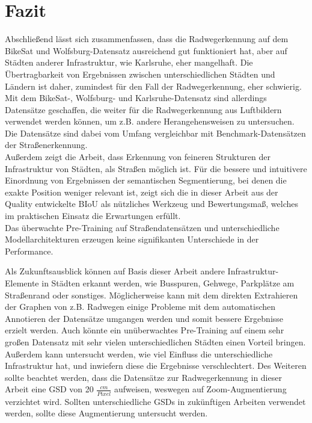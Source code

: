 \chapter{Fazit}

Abschließend lässt sich zusammenfassen, dass die Radwegerkennung auf dem BikeSat und Wolfsburg-Datensatz 
ausreichend gut funktioniert hat, aber auf Städten anderer Infrastruktur, wie Karlsruhe, eher mangelhaft.
Die Übertragbarkeit von Ergebnissen zwischen unterschiedlichen Städten und Ländern ist daher, zumindest 
für den Fall der Radwegerkennung, eher schwierig. Mit dem BikeSat-, Wolfsburg- und Karlsruhe-Datensatz 
sind allerdings Datensätze geschaffen, die weiter für die Radwegerkennung aus Luftbildern verwendet 
werden können, um z.B. andere Herangehensweisen zu untersuchen. Die Datensätze sind dabei vom Umfang 
vergleichbar mit Benchmark-Datensätzen der Straßenerkennung. \\
Außerdem zeigt die Arbeit, dass Erkennung von feineren Strukturen der Infrastruktur von Städten, als Straßen 
möglich ist. Für die bessere und intuitivere Einordnung von Ergebnissen der semantischen Segmentierung, 
bei denen die exakte Position weniger relevant ist, zeigt sich die in dieser Arbeit aus der Quality entwickelte \ac{BIoU} 
als nützliches Werkzeug und Bewertungsmaß, welches im praktischen Einsatz die Erwartungen erfüllt. \\
Das überwachte Pre-Training auf Straßendatensätzen und unterschiedliche Modellarchitekturen 
erzeugen keine signifikanten Unterschiede in der Performance. 

Als Zukunftsausblick können auf Basis dieser Arbeit andere Infrastruktur-Elemente in Städten erkannt werden, 
wie Busspuren, Gehwege, Parkplätze am Straßenrand oder sonstiges. 
Möglicherweise kann mit dem direkten Extrahieren der Graphen von z.B. Radwegen einige Probleme mit dem automatischen 
Annotieren der Datensätze umgangen werden und somit bessere Ergebnisse erzielt werden. 
Auch könnte ein unüberwachtes Pre-Training auf einem sehr großen Datensatz mit sehr vielen unterschiedlichen 
Städten einen Vorteil bringen. Außerdem kann untersucht werden, wie viel Einfluss die unterschiedliche 
Infrastruktur hat, und inwiefern diese die Ergebnisse verschlechtert. 
Des Weiteren sollte beachtet werden, dass die Datensätze zur Radwegerkennung in dieser Arbeit 
eine \ac{GSD} von 20 $\frac{cm}{Pixel}$ aufweisen, weswegen auf Zoom-Augmentierung verzichtet wird. 
Sollten unterschiedliche \acp{GSD} in zukünftigen Arbeiten verwendet werden, sollte diese Augmentierung 
untersucht werden. 
